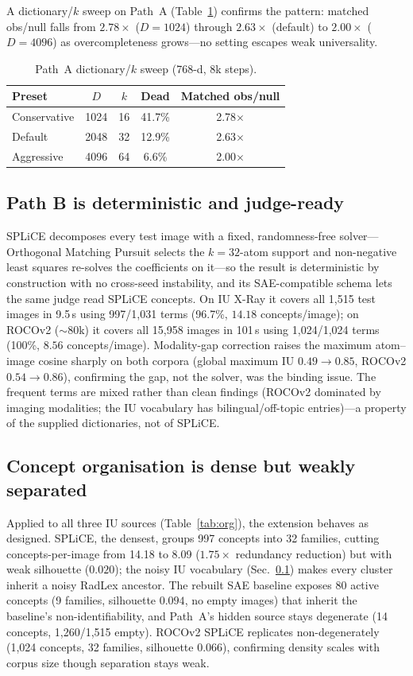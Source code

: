 \documentclass[sigconf, nonacm]{acmart}
\begin{document}
A dictionary/$k$ sweep on Path~A (Table~\ref{tab:ablation}) confirms the pattern: matched obs/null falls from $2.78{\times}$ ($D{=}1024$) through $2.63{\times}$ (default) to $2.00{\times}$ ($D{=}4096$) as overcompleteness grows---no setting escapes weak universality.

\begin{table}[t]
\caption{Path~A dictionary/$k$ sweep (768-d, 8k steps).}
\label{tab:ablation}
\small
\begin{tabular}{lcccc}
\toprule
Preset & $D$ & $k$ & Dead & Matched obs/null \\
\midrule
Conservative & 1024 & 16 & 41.7\% & 2.78$\times$ \\
Default & 2048 & 32 & 12.9\% & 2.63$\times$ \\
Aggressive & 4096 & 64 & 6.6\% & 2.00$\times$ \\
\bottomrule
\end{tabular}
\end{table}

\subsection{Path B is deterministic and judge-ready}
\label{sec:pathb}
SPLiCE decomposes every test image with a fixed, randomness-free solver---Orthogonal Matching Pursuit selects the $k{=}32$-atom support and non-negative least squares re-solves the coefficients on it---so the result is deterministic by construction with no cross-seed instability, and its SAE-compatible schema lets the same judge read SPLiCE concepts. On IU X-Ray it covers all 1,515 test images in 9.5\,s using 997/1,031 terms (96.7\%, $14.18$ concepts/image); on ROCOv2 (${\sim}80$k) it covers all 15,958 images in 101\,s using 1,024/1,024 terms (100\%, $8.56$ concepts/image). Modality-gap correction raises the maximum atom--image cosine sharply on both corpora (global maximum IU $0.49{\to}0.85$, ROCOv2 $0.54{\to}0.86$), confirming the gap, not the solver, was the binding issue. The frequent terms are mixed rather than clean findings (ROCOv2 dominated by imaging modalities; the IU vocabulary has bilingual/off-topic entries)---a property of the supplied dictionaries, not of SPLiCE.

\subsection{Concept organisation is dense but weakly separated}
Applied to all three IU sources (Table~\ref{tab:org}), the extension behaves as designed. SPLiCE, the densest, groups 997 concepts into 32 families, cutting concepts-per-image from 14.18 to 8.09 ($1.75{\times}$ redundancy reduction) but with weak silhouette ($0.020$); the noisy IU vocabulary (Sec.~\ref{sec:pathb}) makes every cluster inherit a noisy RadLex ancestor. The rebuilt SAE baseline exposes 80 active concepts (9 families, silhouette $0.094$, no empty images) that inherit the baseline's non-identifiability, and Path~A's hidden source stays degenerate (14 concepts, 1{,}260/1{,}515 empty). ROCOv2 SPLiCE replicates non-degenerately (1{,}024 concepts, 32 families, silhouette $0.066$), confirming density scales with corpus size though separation stays weak.
\end{document}
